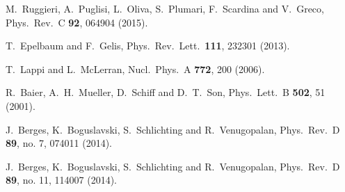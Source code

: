 \documentclass[aps,prc,a4paper,nofootinbib,
preprintnumbers,superscriptaddress,twocolumn,showpacs,showkeys]{revtex4}
\begin{document}
\begin{thebibliography}{99}
  M.~Ruggieri, A.~Puglisi, L.~Oliva, S.~Plumari, F.~Scardina and V.~Greco,
  Phys.\ Rev.\ C {\bf 92}, 064904 (2015).

  T.~Epelbaum and F.~Gelis,
  Phys.\ Rev.\ Lett.\  {\bf 111}, 232301 (2013).
  
  T.~Lappi and L.~McLerran,
  Nucl.\ Phys.\ A {\bf 772}, 200 (2006).
  
  
  
  R.~Baier, A.~H.~Mueller, D.~Schiff and D.~T.~Son,
  Phys.\ Lett.\ B {\bf 502}, 51 (2001).

  J.~Berges, K.~Boguslavski, S.~Schlichting and R.~Venugopalan,
  Phys.\ Rev.\ D {\bf 89}, no. 7, 074011 (2014).

  J.~Berges, K.~Boguslavski, S.~Schlichting and R.~Venugopalan,
  Phys.\ Rev.\ D {\bf 89}, no. 11, 114007 (2014).


\end{thebibliography}
\end{document}
